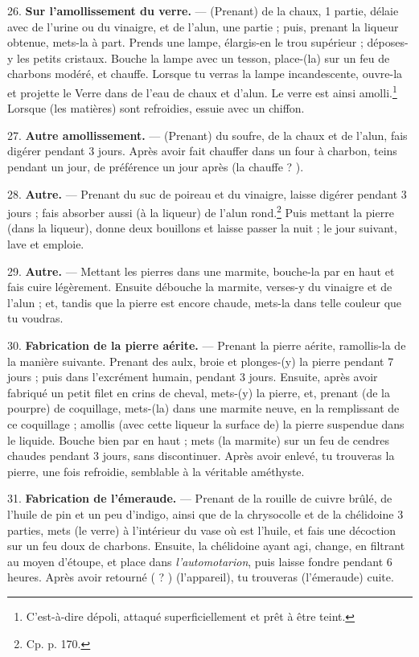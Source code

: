 \documentclass[a4paper, 11pt, oneside, polutonikogreek, french]{article}
\begin{document}
26. \textbf{Sur l'amollissement du verre.} --- (Prenant) de la chaux, 1 partie, délaie avec de l'urine ou du vinaigre, et de l'alun, une partie ; puis, prenant la liqueur obtenue, mets-la à part. Prends une lampe, élargis-en le trou supérieur ; déposes-y les petits cristaux. Bouche la lampe avec un tesson, place-(la) sur un feu de charbons modéré, et chauffe. Lorsque tu verras la lampe incandescente, ouvre-la et projette le Verre dans de l'eau de chaux et d'alun. Le verre est ainsi amolli.\footnote{C'est-à-dire dépoli, attaqué superficiellement et prêt à être teint.} Lorsque (les matières) sont refroidies, essuie avec un chiffon.

27. \textbf{Autre amollissement.} --- (Prenant) du soufre, de la chaux et de l'alun, fais digérer pendant 3 jours. Après avoir fait chauffer dans un four à charbon, teins pendant un jour, de préférence un jour après (la chauffe ? ).

28. \textbf{Autre.} --- Prenant du suc de poireau et du vinaigre, laisse digérer pendant 3 jours ; fais absorber aussi (à la liqueur) de l'alun rond.\footnote{Cp. p. 170.} Puis mettant la pierre (dans la liqueur), donne deux bouillons et laisse passer la nuit ; le jour suivant, lave et emploie.

29. \textbf{Autre.} --- Mettant les pierres dans une marmite, bouche-la par en haut et fais cuire légèrement. Ensuite débouche la marmite, verses-y du vinaigre et de l'alun ; et, tandis que la pierre est encore chaude, mets-la dans telle couleur que tu voudras.

30. \textbf{Fabrication de la pierre aérite.} --- Prenant la pierre aérite, ramollis-la de la manière suivante. Prenant des aulx, broie et plonges-(y) la pierre pendant 7 jours ; puis dans l'excrément humain, pendant 3 jours. Ensuite, après avoir fabriqué un petit filet en crins de cheval, mets-(y) la pierre, et, prenant (de la pourpre) de coquillage, mets-(la) dans une marmite neuve, en la remplissant de ce coquillage ; amollis (avec cette liqueur la surface de) la pierre suspendue dans le liquide. Bouche bien par en haut ; mets (la marmite) sur un feu de cendres chaudes pendant 3 jours, sans discontinuer. Après avoir enlevé, tu trouveras la pierre, une fois refroidie, semblable à la véritable améthyste.

31. \textbf{Fabrication de l'émeraude.} --- Prenant de la rouille de cuivre brûlé, de l'huile de pin et un peu d'indigo, ainsi que de la chrysocolle et de la chélidoine 3 parties, mets (le verre) à l'intérieur du vase où est l'huile, et fais une décoction sur un feu doux de charbons. Ensuite, la chélidoine ayant agi, change, en filtrant au moyen d'étoupe, et place dans \emph{l'automotarion}, puis laisse fondre pendant 6 heures. Après avoir retourné ( ? ) (l'appareil), tu trouveras (l'émeraude) cuite.
\end{document}
